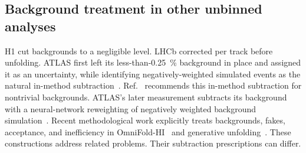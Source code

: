 \subsection{Background treatment in other unbinned analyses}
\label{sec:negweight-practice}
H1 cut backgrounds to a negligible level. LHCb corrected per track before unfolding. ATLAS first left its less-than-\SI{0.25}{\percent} background in place and assigned it as an uncertainty, while identifying negatively-weighted simulated events as the natural in-method subtraction~\cite{ATLAS:2024jets,Andreassen:2021zzk}. Ref.~\cite{Canelli:2025guide} recommends this in-method subtraction for nontrivial backgrounds. ATLAS's later measurement subtracts its background with a neural-network reweighting of negatively weighted background simulation~\cite{ATLAS:2026fullps}. Recent methodological work explicitly treats backgrounds, fakes, acceptance, and inefficiency in OmniFold-HI~\cite{Falcao:2025backgrounds} and generative unfolding~\cite{Butter:2025genfold}. These constructions address related problems. Their subtraction prescriptions can differ.
